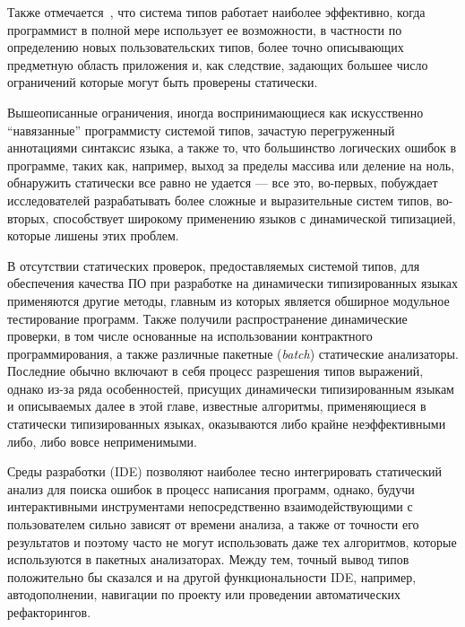 Также отмечается~\cite{Pierce2002}, что система типов работает наиболее
эффективно, когда программист в полной мере использует ее возможности, в
частности по определению новых пользовательских типов, более точно описывающих
предметную область приложения и, как следствие, задающих большее число ограничений
которые могут быть проверены статически.


Вышеописанные ограничения, иногда воспринимающиеся как искусственно ``навязанные''
программисту системой типов, зачастую перегруженный аннотациями синтаксис языка,
а также то, что большинство логических ошибок в программе, таких как, например,
выход за пределы массива или деление на ноль, обнаружить статически все равно не
удается --- все это, во-первых, побуждает исследователей разрабатывать более
сложные и выразительные систем типов, во-вторых, способствует широкому
применению языков с динамической типизацией, которые лишены этих проблем.

В отсутствии статических проверок, предоставляемых системой типов, для
обеспечения качества ПО при разработке на динамически типизированных языках
применяются другие методы, главным из которых является обширное модульное
тестирование программ. Также получили распространение динамические проверки, в том
числе основанные на использовании контрактного программирования, а также
различные пакетные (\emph{batch}) статические анализаторы. Последние обычно
включают в себя процесс разрешения типов выражений, однако из-за ряда
особенностей, присущих динамически типизированным языкам и описываемых далее в
этой главе, известные алгоритмы, применяющиеся в статически типизированных
языках, оказываются либо крайне неэффективными либо, либо вовсе неприменимыми.

Среды разработки (IDE) позволяют наиболее тесно интегрировать статический анализ
для поиска ошибок в процесс написания программ, однако, будучи
интерактивными инструментами непосредственно взаимодействующими с пользователем
сильно зависят от времени анализа, а также от точности его результатов и поэтому
часто не могут использовать даже тех алгоритмов, которые используются в пакетных
анализаторах. Между тем, точный вывод типов положительно бы сказался и на
другой функциональности IDE, например, автодополнении, навигации по проекту или
проведении автоматических рефакторингов.

